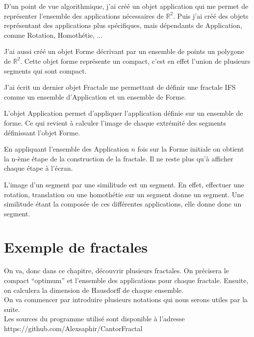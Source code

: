 \documentclass[a4paper, 12pt]{report}
\begin{document}
			\vspace{.2 cm}\hspace{.7 cm}
			D'un point de vue algorithmique, j'ai créé un objet application qui me permet de représenter l'ensemble des applications nécessaires de $\mathds{R}^2$. Puis j'ai créé des objets représentant des applications plus spécifiques, mais dépendants de Application, comme Rotation, Homothétie, ...
			
			\vspace{.2 cm}\hspace{.7 cm}
			J'ai aussi créé un objet Forme décrivant par un ensemble de points un polygone de $\mathds{R}^2$. Cette objet forme représente un compact, c'est en effet l'union de plusieurs segments qui sont compact.
			
			\vspace{.2 cm}\hspace{.7 cm}
			J'ai écrit un dernier objet Fractale me permettant de définir une fractale IFS comme un ensemble d'Application et un ensemble de Forme.
			
			\vspace{.2 cm}\hspace{.7 cm}
			L'objet Application permet d'appliquer l'application définie sur un ensemble de forme. Ce qui revient à calculer l'image de chaque extrémité des segments définissant l'objet Forme.
	
			\vspace{.2 cm}\hspace{.7 cm}
			En appliquant l'ensemble des Application $n$ fois sur la Forme initiale on obtient la n-ème étape de la construction de la fractale. Il ne reste plus qu'à afficher chaque étape à l'écran.
	
			\begin{remark*}
				L'image d'un segment par une similitude est un segment. En effet, effectuer une rotation, translation ou une homothétie sur un segment donne un segment. Une similitude étant la composée de ces différentes applications, elle donne donc un segment.
			\end{remark*}

	
	\chapter{\bf Exemple de fractales}
		On va, donc dans ce chapitre, découvrir plusieurs fractales. On précisera le compact ``optimum'' et l'ensemble des applications pour chaque fractale. Ensuite, on calculera la dimension de Hausdorff de chaque ensemble.\\
		On va commencer par introduire plusieurs notations qui nous serons utiles par la suite.\\
			Les sources du programme utilisé sont disponible à l'adresse https://github.com/Alexsaphir/CantorFractal
\end{document}
